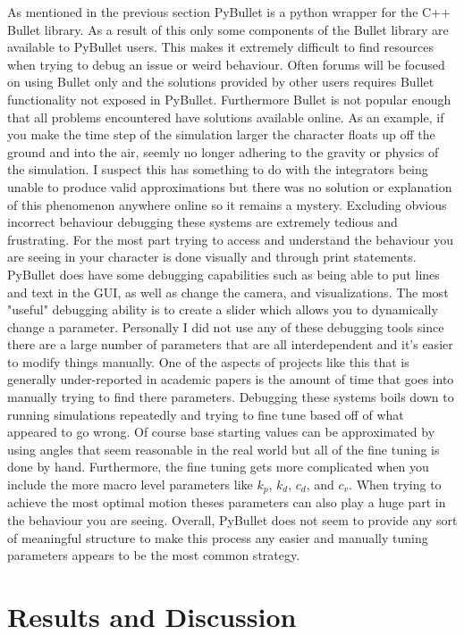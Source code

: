 \documentclass[12pt, a4paper]{article}
\begin{document}
As mentioned in the previous section PyBullet is a python wrapper for the C++ Bullet library. As a result of this only some components of the Bullet library are available to PyBullet users. This makes it extremely difficult to find resources when trying to debug an issue or weird behaviour. Often forums will be focused on using Bullet only and the solutions provided by other users requires Bullet functionality not exposed in PyBullet. Furthermore Bullet is not popular enough that all problems encountered have solutions available online. As an example, if you make the time step of the simulation larger the character floats up off the ground and into the air, seemly no longer adhering to the gravity or physics of the simulation. I suspect this has something to do with the integrators being unable to produce valid approximations but there was no solution or explanation of this phenomenon anywhere online so it remains a mystery. Excluding obvious incorrect behaviour debugging these systems are extremely tedious and frustrating. For the most part trying to access and understand the behaviour you are seeing in your character is done visually and through print statements. PyBullet does have some debugging capabilities such as being able to put lines and text in the GUI, as well as change the camera, and visualizations. The most "useful" debugging ability is to create a slider which allows you to dynamically change a parameter. Personally I did not use any of these debugging tools since there are a large number of parameters that are all interdependent and it's easier to modify things manually. One of the aspects of projects like this that is generally under-reported in academic papers is the amount of time that goes into manually trying to find there parameters. Debugging these systems boils down to running simulations repeatedly and trying to fine tune based off of what appeared to go wrong. Of course base starting values can be approximated by using angles that seem reasonable in the real world but all of the fine tuning is done by hand. Furthermore, the fine tuning gets more complicated when you include the more macro level parameters like $k_p$, $k_d$, $c_d$, and $c_v$. When trying to achieve the most optimal motion theses parameters can also play a huge part in the behaviour you are seeing. Overall, PyBullet does not seem to provide any sort of meaningful structure to make this process any easier and manually tuning parameters appears to be the most common strategy.

\section{Results and Discussion}
\end{document}
